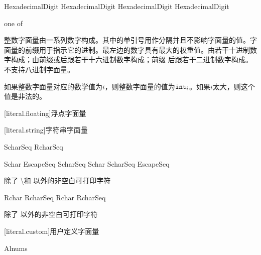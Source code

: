 \begin{bnf}
 \br
     HexadecimalDigit \bnflp\terminal{\textquotesingle}\bnfq HexadecimalDigit\bnfrp\bnfs
     HexadecimalDigit \bnflp\terminal{\textquotesingle}\bnfq HexadecimalDigit\bnfrp\bnfs
\end{bnf}

\begin{bnf}
 \textnormal{one of} \br
     \br
     \br
\end{bnf}

\pnum
整数字面量由一系列数字构成。其中的单引号用作分隔并且不影响字面量的值。字面量的前缀用于指示它的进制。最左边的数字具有最大的权重值。由若干十进制数字构成；由前缀或后跟若干十六进制数字构成；前缀  后跟若干二进制数字构成。\X 不支持八进制字面量。

\pnum
如果整数字面量对应的数学值为$i$，则整数字面量的值为$\texttt{int}_i$。如果$i$太大，则这个值是非法的。

[literal.floating]{浮点字面量}

[literal.string]{字符串字面量}

\begin{bnf}
 \br
    \terminal{\textquotedbl} ScharSeq\bnfq \terminal{\textquotedbl} \br
     RcharSeq\bnfq \terminal{\textquotedbl}
\end{bnf}

\begin{bnf}
 \br
    Schar \br
    EscapeSeq \br
    ScharSeq Schar \br
    ScharSeq EscapeSeq
\end{bnf}

\begin{bnf}
 \br
    \textnormal{除了 \textbackslash 和 \textquotedbl 以外的非空白可打印字符}
\end{bnf}

\begin{bnf}
 \br
    Rchar \br
    \terminal{\textquotedbl\textquotedbl} \br
    RcharSeq Rchar \br
    RcharSeq \terminal{\textquotedbl\textquotedbl}
\end{bnf}

\begin{bnf}
 \br
    \textnormal{除了 \textquotedbl 以外的非空白可打印字符}
\end{bnf}

[literal.custom]{用户定义字面量}

\begin{bnf}
 \br
    \terminal{\_} Alnums
\end{bnf}
